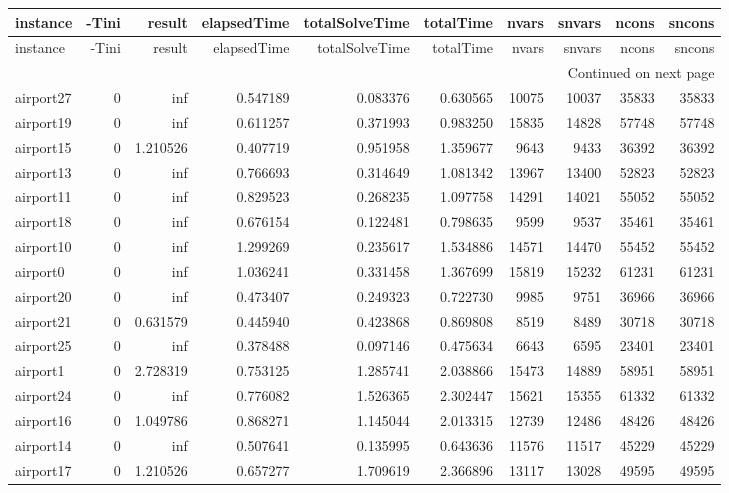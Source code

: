 \begin{longtable}{|l|r|r|r|r|r|r|r|r|r|}
\toprule
instance & -Tini & result & elapsedTime & totalSolveTime & totalTime & nvars & snvars & ncons & sncons \\
\midrule
\endfirsthead
\toprule
instance & -Tini & result & elapsedTime & totalSolveTime & totalTime & nvars & snvars & ncons & sncons \\
\midrule
\endhead
\midrule
\multicolumn{10}{r}{Continued on next page} \\
\midrule
\endfoot
\bottomrule
\endlastfoot
airport27 & 0 & inf & 0.547189 & 0.083376 & 0.630565 & 10075 & 10037 & 35833 & 35833 \\
airport19 & 0 & inf & 0.611257 & 0.371993 & 0.983250 & 15835 & 14828 & 57748 & 57748 \\
airport15 & 0 & 1.210526 & 0.407719 & 0.951958 & 1.359677 & 9643 & 9433 & 36392 & 36392 \\
airport13 & 0 & inf & 0.766693 & 0.314649 & 1.081342 & 13967 & 13400 & 52823 & 52823 \\
airport11 & 0 & inf & 0.829523 & 0.268235 & 1.097758 & 14291 & 14021 & 55052 & 55052 \\
airport18 & 0 & inf & 0.676154 & 0.122481 & 0.798635 & 9599 & 9537 & 35461 & 35461 \\
airport10 & 0 & inf & 1.299269 & 0.235617 & 1.534886 & 14571 & 14470 & 55452 & 55452 \\
airport0 & 0 & inf & 1.036241 & 0.331458 & 1.367699 & 15819 & 15232 & 61231 & 61231 \\
airport20 & 0 & inf & 0.473407 & 0.249323 & 0.722730 & 9985 & 9751 & 36966 & 36966 \\
airport21 & 0 & 0.631579 & 0.445940 & 0.423868 & 0.869808 & 8519 & 8489 & 30718 & 30718 \\
airport25 & 0 & inf & 0.378488 & 0.097146 & 0.475634 & 6643 & 6595 & 23401 & 23401 \\
airport1 & 0 & 2.728319 & 0.753125 & 1.285741 & 2.038866 & 15473 & 14889 & 58951 & 58951 \\
airport24 & 0 & inf & 0.776082 & 1.526365 & 2.302447 & 15621 & 15355 & 61332 & 61332 \\
airport16 & 0 & 1.049786 & 0.868271 & 1.145044 & 2.013315 & 12739 & 12486 & 48426 & 48426 \\
airport14 & 0 & inf & 0.507641 & 0.135995 & 0.643636 & 11576 & 11517 & 45229 & 45229 \\
airport17 & 0 & 1.210526 & 0.657277 & 1.709619 & 2.366896 & 13117 & 13028 & 49595 & 49595 \\

\end{longtable}
